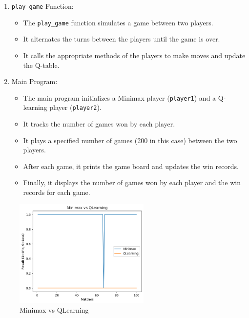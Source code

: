 \documentclass{article}
\begin{document}
\begin{enumerate}
  \item \texttt{play\_game} Function:
    \begin{itemize}
      \item The \texttt{play\_game} function simulates a game between two players.
      \item It alternates the turns between the players until the game is over.
      \item It calls the appropriate methods of the players to make moves and update the Q-table.
    \end{itemize}

  \item Main Program:
    \begin{itemize}
      \item The main program initializes a Minimax player (\texttt{player1}) and a Q-learning player (\texttt{player2}).
      \item It tracks the number of games won by each player.
      \item It plays a specified number of games (200 in this case) between the two players.
      \item After each game, it prints the game board and updates the win records.
      \item Finally, it displays the number of games won by each player and the win records for each game.
    \end{itemize}
\end{enumerate}
\begin{figure}[htbp]
    \centering
    \includegraphics[width=0.6\textwidth]{img 1.png}
    \caption{Minimax vs QLearning}
    \label{fig:example}
\end{figure}
\end{document}
